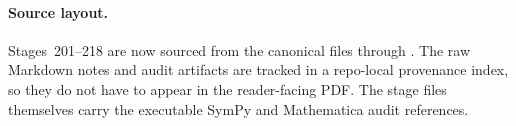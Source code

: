 \paragraph{Source layout.}
Stages~201--218 are now sourced from the canonical files  through .  The raw Markdown notes and audit artifacts are tracked in a repo-local provenance index, so they do not have to appear in the reader-facing PDF.  The stage files themselves carry the executable SymPy and Mathematica audit references.

\begingroup
\let\clearpage\relax

\clearpage

\clearpage

\clearpage

\clearpage

\clearpage

\clearpage

\clearpage

\clearpage

\clearpage

\clearpage

\clearpage

\clearpage

\clearpage

\clearpage

\clearpage

\clearpage

\clearpage

\endgroup
